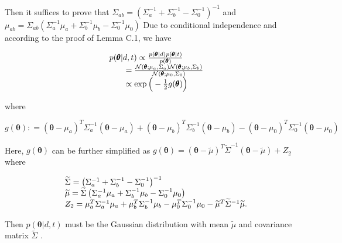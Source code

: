 Then it suffices to prove that
\(\Sigma _ { a b } = ( \Sigma _ { a } ^ { - 1 } { + } \Sigma _ { b } ^ { - 1 } { - } \Sigma _ { 0 } ^ { - 1 } ) ^ { - 1 }\)
and
\(\mu _ { a b } = \Sigma _ { a b } \left( \Sigma _ { a } ^ { - 1 } \mu _ { a } + \Sigma _ { b } ^ { - 1 } \mu _ { b } - \Sigma _ { 0 } ^ { - 1 } \mu _ { 0 } \right)\)
Due to conditional independence and according to the proof of Lemma C.1,
we have

\[
\begin{array} { r l } & { p ( \pmb \theta | d , t ) \propto \frac { p ( \pmb \theta | d ) p ( \pmb \theta | t ) } { p ( \pmb \theta ) } } \\ & { \qquad = \frac { \mathcal { N } ( \pmb \theta ; \mu _ { a } , \Sigma _ { a } ) \mathcal { N } ( \pmb \theta ; \mu _ { b } , \Sigma _ { b } ) } { \mathcal { N } ( \pmb \theta ; \mu _ { 0 } , \Sigma _ { 0 } ) } } \\ & { \qquad \propto \exp \Big ( - \frac { 1 } { 2 } g ( \pmb \theta ) \Big ) } \end{array}
\]

where

\[
g ( \pmb \theta ) : = ( \pmb \theta - \mu _ { a } ) ^ { T } \Sigma _ { a } ^ { - 1 } ( \pmb \theta - \mu _ { a } ) + ( \pmb \theta - \mu _ { b } ) ^ { T } \Sigma _ { b } ^ { - 1 } ( \pmb \theta - \mu _ { b } ) - ( \pmb \theta - \mu _ { 0 } ) ^ { T } \Sigma _ { 0 } ^ { - 1 } ( \pmb \theta - \mu _ { 0 } )
\]

Here, \(g ( \pmb \theta )\) can be further simplified as
\(g ( \pmb \theta ) = ( \pmb \theta - \widetilde \mu ) ^ { T } \widetilde \Sigma ^ { - 1 } ( \pmb \theta - \widetilde \mu ) + Z _ { 2 }\)
where

\[
\begin{array} { r l } & { \widetilde { \Sigma } = \bigl ( \Sigma _ { a } ^ { - 1 } + \Sigma _ { b } ^ { - 1 } - \Sigma _ { 0 } ^ { - 1 } \bigr ) ^ { - 1 } } \\ & { \widetilde { \mu } = \widetilde { \Sigma } \left( \Sigma _ { a } ^ { - 1 } \mu _ { a } + \Sigma _ { b } ^ { - 1 } \mu _ { b } - \Sigma _ { 0 } ^ { - 1 } \mu _ { 0 } \right) } \\ & { Z _ { 2 } = \mu _ { a } ^ { T } \Sigma _ { a } ^ { - 1 } \mu _ { a } + \mu _ { b } ^ { T } \Sigma _ { b } ^ { - 1 } \mu _ { b } - \mu _ { 0 } ^ { T } \Sigma _ { 0 } ^ { - 1 } \mu _ { 0 } - \widetilde { \mu } ^ { T } \widetilde { \Sigma } ^ { - 1 } \widetilde { \mu } . } \end{array}
\]

Then \(p ( \pmb \theta | d , t )\) must be the Gaussian distribution
with mean \(\widetilde { \mu }\) and covariance matrix
\(\widetilde { \Sigma }\) .

